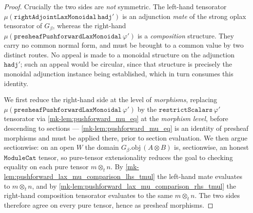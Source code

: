 \begin{proof}
  \leanok
  Crucially the two sides are \emph{not} symmetric. The left-hand tensorator
  \(\mu(\mathtt{rightAdjointLaxMonoidal}\,\mathtt{hadj}')\) is an adjunction \emph{mate} of the strong
  oplax tensorator of \(G_\beta\), whereas the right-hand
  \(\mu(\mathtt{presheafPushforwardLaxMonoidal}\,\varphi')\) is a \emph{composition} structure. They
  carry no common normal form, and must be brought to a common value by two distinct routes. No
  appeal is made to a monoidal structure on the adjunction \(\mathtt{hadj}'\); such an appeal would
  be circular, since that structure is precisely the monoidal adjunction instance being established,
  which in turn consumes this identity.

  We first reduce the right-hand side at the level of \emph{morphisms}, replacing
  \(\mu(\mathtt{presheafPushforwardLaxMonoidal}\,\varphi')\) by the
  \(\mathtt{restrictScalars}\,\varphi'\) tensorator via \ref{mk-lem:pushforward_mu_eq} at the
  \emph{morphism level}, before descending to sections --- \ref{mk-lem:pushforward_mu_eq} is an
  identity of presheaf morphisms and must be applied there, prior to section evaluation. We then argue sectionwise: on an open \(W\) the domain
  \(G_\beta.\mathrm{obj}\,(A \otimes B)\) is, sectionwise, an honest \(\mathtt{ModuleCat}\) tensor, so
  pure-tensor extensionality reduces the goal to checking equality on each pure tensor
  \(m \otimes_t n\). By \ref{mk-lem:pushforward_lax_mu_comparison_lhs_tmul} the left-hand mate evaluates
  to \(m \otimes_t n\), and by \ref{mk-lem:pushforward_lax_mu_comparison_rhs_tmul} the right-hand
  composition tensorator evaluates to the same \(m \otimes_t n\). The two sides therefore agree on
  every pure tensor, hence as presheaf morphisms.
\end{proof}

